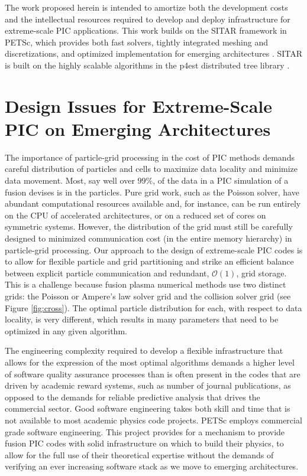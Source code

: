 \documentclass[review]{siamart}
\newcommand{\Order}[1]{\ensuremath{\mathcal{O}(#1)}}    %
\begin{document}
The work proposed herein is intended to amortize both the development costs and the intellectual resources required to develop and deploy infrastructure for extreme-scale PIC applications.
This work builds on the SITAR framework in PETSc, which provides both fast solvers, tightly integrated meshing and discretizations, and optimized implementation for emerging architectures \cite{KnepleyBrownMcInnesSmithRuppAdams2015}.
SITAR is built on the highly scalable algorithms in the p4est distributed tree library \cite{DBLP:journals/siamsc/IsaacBWG15,Rudi:2015:EIS:2807591.2807675,Stadler1033}.

\section{Design Issues for Extreme-Scale PIC on Emerging Architectures}

The importance of particle-grid processing in the cost of PIC methods demands careful distribution of particles and cells to maximize data locality and minimize data movement.
Most, say well over $99\%$, of the data in a PIC simulation of a fusion devises is in the particles.
Pure grid work, such as the Poisson solver, have abundant computational resources available and, for instance, can be run entirely on the CPU of accelerated architectures, or on a reduced set of cores on symmetric systems.
However, the distribution of the grid must still be carefully designed to minimized communication cost (in the entire memory hierarchy) in particle-grid processing.
Our approach to the design of extreme-scale PIC codes is to allow for flexible particle and grid partitioning and strike an efficient balance between explicit particle communication and redundant, \Order{1}, grid storage.
This is a challenge because fusion plasma numerical methods use two distinct grids: the Poisson or Ampere's law solver grid and the collision solver grid (see Figure \ref{fig:cross}).
The optimal particle distribution for each, with respect to data locality, is very different, which results in many parameters that need to be optimized in any given algorithm.

The engineering complexity required to develop a flexible infrastructure that allows for the expression of the most optimal algorithms demands a higher level of software quality assurance processes than is often present in the codes that are driven by academic reward systems, such as number of journal publications, as opposed to the demands for reliable predictive analysis that drives the commercial sector.
Good software engineering takes both skill and time that is not available to most academic physics code projects.
PETSc employs commercial grade software engineering.
This project provides for a mechanism to provide fusion PIC codes with solid infrastructure on which to build their physics, to allow for the full use of their theoretical expertise without the demands of verifying an ever increasing software stack as we move to emerging architectures.
\end{document}
